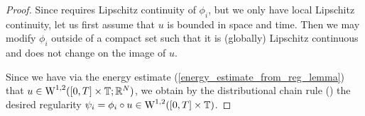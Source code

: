 \begin{proof}
	Since  requires Lipschitz continuity of $ \phi_{ i } $, but we only have local Lipschitz continuity, let us first assume that $ u $ is bounded in space and time. Then we may modify $ \phi_{ i } $ outside of a compact set such that it is (globally) Lipschitz continuous and does not change on the image of $ u $.
	
	Since we have via the energy estimate 
	(\ref{energy_estimate_from_reg_lemma}) that $ u \in \operatorname{W}^{ 1 , 2 } ( [ 0 , 
	T 
	] \times \operatorname{\mathbb{T}} ; \mathbb{ R }^{ N } ) $, we obtain by the 
	distributional chain rule 
	() 
	the desired regularity $ \psi_{ i } = \phi_{ i } \circ u \in \operatorname{W}^{ 1 , 2 } 
	( [ 0, 
	T ] \times 
	\operatorname{\mathbb{T}} ) $.
	

\end{proof}
